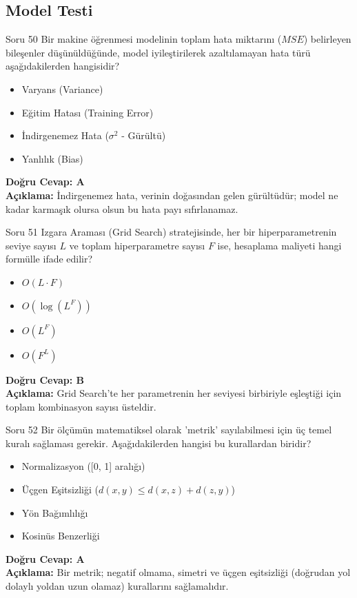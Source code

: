 \documentclass[12pt,a4paper]{article}
\begin{document}
\newpage
\subsection{Model Testi}

\begin{testcard}{Soru 50}
    Bir makine öğrenmesi modelinin toplam hata miktarını ($MSE$) belirleyen bileşenler düşünüldüğünde, model iyileştirilerek azaltılamayan hata türü aşağıdakilerden hangisidir?
    \begin{itemize}
        \item[A)] Varyans (Variance)
        \item[B)] Eğitim Hatası (Training Error)
        \item[C)] İndirgenemez Hata ($\sigma^2$ - Gürültü)
        \item[D)] Yanlılık (Bias)
    \end{itemize}
    \tcblower
    \textbf{Doğru Cevap: A} \\
    \textbf{Açıklama:} İndirgenemez hata, verinin doğasından gelen gürültüdür; model ne kadar karmaşık olursa olsun bu hata payı sıfırlanamaz.
\end{testcard}

\begin{testcard}{Soru 51}
    Izgara Araması (Grid Search) stratejisinde, her bir hiperparametrenin seviye sayısı $L$ ve toplam hiperparametre sayısı $F$ ise, hesaplama maliyeti hangi formülle ifade edilir?
    \begin{itemize}
        \item[A)] $O(L \cdot F)$
        \item[B)] $O(\log(L^F))$
        \item[C)] $O(L^F)$
        \item[D)] $O(F^L)$
    \end{itemize}
    \tcblower
    \textbf{Doğru Cevap: B} \\
    \textbf{Açıklama:} Grid Search'te her parametrenin her seviyesi birbiriyle eşleştiği için toplam kombinasyon sayısı üsteldir.
\end{testcard}

\begin{testcard}{Soru 52}
    Bir ölçümün matematiksel olarak 'metrik' sayılabilmesi için üç temel kuralı sağlaması gerekir. Aşağıdakilerden hangisi bu kurallardan biridir?
    \begin{itemize}
        \item[A)] Normalizasyon ([0, 1] aralığı)
        \item[B)] Üçgen Eşitsizliği ($d(x, y) \leq d(x, z) + d(z, y)$)
        \item[C)] Yön Bağımlılığı
        \item[D)] Kosinüs Benzerliği
    \end{itemize}
    \tcblower
    \textbf{Doğru Cevap: A} \\
    \textbf{Açıklama:} Bir metrik; negatif olmama, simetri ve üçgen eşitsizliği (doğrudan yol dolaylı yoldan uzun olamaz) kurallarını sağlamalıdır.
\end{testcard}
\end{document}
